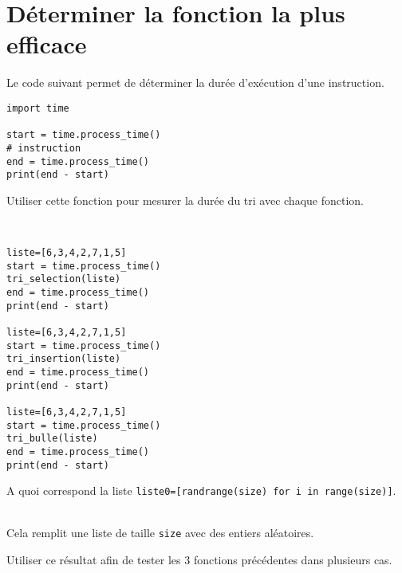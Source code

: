\section{Déterminer la fonction la plus efficace}

Le code suivant permet de déterminer la durée d'exécution d'une instruction.

\begin{verbatim}
import time

start = time.process_time()
# instruction
end = time.process_time()
print(end - start)
\end{verbatim} 

\begin{exercice}
Utiliser cette fonction pour mesurer la durée du tri avec chaque fonction.
\end{exercice}

\begin{solution}~\\
\vspace{-0.7cm}
\begin{verbatim}
liste=[6,3,4,2,7,1,5]
start = time.process_time()
tri_selection(liste)
end = time.process_time()
print(end - start)

liste=[6,3,4,2,7,1,5]
start = time.process_time()
tri_insertion(liste)
end = time.process_time()
print(end - start)

liste=[6,3,4,2,7,1,5]
start = time.process_time()
tri_bulle(liste)
end = time.process_time()
print(end - start)
\end{verbatim}    
\end{solution}

\begin{exercice}
A quoi correspond la liste \verb?liste0=[randrange(size) for i in range(size)]?.
\end{exercice}

\begin{solution}~\\
\vspace{-0.7cm}
Cela remplit une liste de taille \verb?size? avec des entiers aléatoires.
\newpage
\end{solution}

\begin{exercice}
Utiliser ce résultat afin de tester les 3 fonctions précédentes dans plusieurs cas.
\end{exercice}        

